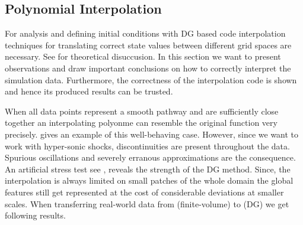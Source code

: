 \subsection{Polynomial Interpolation}

For analysis and defining initial conditions with DG based code interpolation
techniques for translating correct state values between different grid spaces
are necessary. See  for theoretical disuccusion.
In this section we want to present observations and draw important conclusions
on how to correctly interpret the simulation data. Furthermore, the correctness
of the interpolation code is shown and hence its produced results can be trusted.

When all data points represent a smooth pathway and are sufficiently close
together an interpolating polyonme can resemble the original function very
precisely.  gives an example of this well-behaving
case.
However, since we want to work with hyper-sonic shocks, discontinuities are
present throughout the data. Spurious oscillations and severely erranous
approximations are the consequence. An artificial stress test
see , reveals the strength of the DG method. Since,
the interpolation is always limited on small patches of the whole domain
the global features still get represented at the cost of considerable deviations
at smaller scales.
When transferring real-world data from \FLASH (finite-volume) to \FLEXI (DG) we get
following results.




